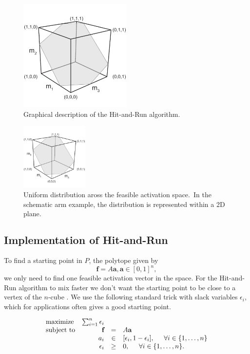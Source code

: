 \begin{figure}[h]
\centering
\includegraphics[width=0.5\textwidth,page=10]{sections/figs/HitandRunSchematics_all.pdf}
\caption{Graphical description of the Hit-and-Run algorithm.}
\label{fig:hitruncube}
\end{figure}

\begin{figure}[h]
\centering
\includegraphics[width=0.3\textwidth,page=9]{sections/figs/HitandRunSchematics_all.pdf}
\caption{Uniform distribution aross the feasible activation space.\ In the schematic arm example, the distribution is represented within a 2D plane.}
\label{fig:posthitrun_distribution}
\end{figure}

\subsection{Implementation of Hit-and-Run}
To find a starting point in $P$, the polytope given by
\[\textbf{f} = A\textbf{a}, \textbf{a} \in [0,1]^n,\]
we only need to find one feasible activation vector in the space.
For the Hit-and-Run algorithm to mix faster we don't want the starting point to be close to a vertex of the $n$-cube \cite{Lovasz}.
We use the following standard trick with slack variables $\epsilon_i$, which for applications often gives a good starting point.

\begin{equation}\label{eq:LP_r}
\begin{array}{lrcl}
\mbox{maximize} & \sum_{i=1}^n \epsilon_i \\ 
\mbox{subject to} & \textbf{f} &=& A\textbf{a}\\
  & a_i &\in& [\epsilon_i, 1- \epsilon_i], \hspace{5mm} \forall i \in \{1,\dots,n\}  \\
  & \epsilon_i &\geq& 0, \hspace{5mm} \forall i \in \{1,\dots,n\}.  
\end{array}
\end{equation}


